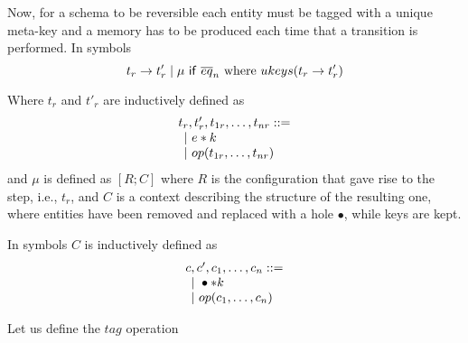 \documentclass{article}[12pt,a4paper]
\theoremstyle{definition}
\newcommand{\paral}{\;|\;}
\begin{document}
Now, for a schema to be reversible each entity must be tagged with a unique meta-key and a
memory has to be produced each time that a transition is performed. In symbols
\[t_r \rightarrow t'_r \paral \mu ~\ms{if}~\overline{eq}_n~\text{where
  }ukeys(t_r\rightarrow t'_r)\]

Where $t_r$ and $t'_r$ are inductively defined as
\[
  \begin{array}{l}
    t_r,t'_r,t_{1r},\ldots,t_{nr} ::=\\
    \hspace{1ex}|~e*k\\
    \hspace{1ex}|~op(t_{1r},\ldots,t_{nr})\\
  \end{array}
\]
and $\mu$ is defined as $[R;C]$ where $R$ is the configuration that gave rise to
the step, i.e., $t_r$, and $C$ is a context describing the structure of the
resulting one, where entities have been removed and replaced with a hole $\bullet$, while keys are kept.

In symbols $C$ is inductively defined as
\[
  \begin{array}{l}
    c,c',c_1,\ldots,c_n ::=\\
    \hspace{1ex}|~\bullet*k\\
    \hspace{1ex}|~op(c_1,\ldots,c_n)\\
  \end{array}
\]
  
Let us define the $tag$ operation
\end{document}
